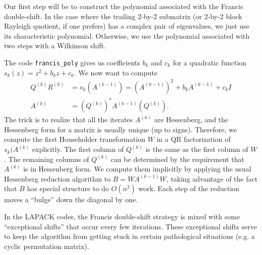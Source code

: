 Our first step will be to construct the polynomial associated with the
Francis double-shift.  In the case where the trailing 2-by-2 submatrix
(or 2-by-2 block Rayleigh quotient, if one prefers) has a complex pair
of eigenvalues, we just use its characteristic polynomial.  Otherwise,
we use the polynomial associated with two steps with a Wilkinson shift.



The code {\tt francis\_poly} gives us coefficients $b_k$ and $c_k$ for a
quadratic function $s_k(z) = z^2 + b_k z + c_k$.  We now want to compute
\begin{align*}
  Q^{(k)} R^{(k)} &= s_k(A^{(k-1)}) = (A^{(k-1)})^2 + b_k A^{(k-1)} + c_k I \\
  A^{(k)}        &= (Q^{(k)})^* A^{(k-1)} (Q^{(k)}).
\end{align*}
The trick is to realize that all the iterates $A^{(k)}$ are Hessenberg,
and the Hessenberg form for a matrix is usually unique (up to signs).
Therefore, we compute the first Householder transformation $W$ in a
QR factorization of $s_k(A^{(k)}$ explicitly.  The first column of $Q^{(k)}$
is the same as the first column of $W$.  The remaining columns of $Q^{(k)}$
can be determined by the requirement that $A^{(k)}$ is in Hessenberg form.
We compute them implicitly by applying the usual Hessenberg reduction algorithm
to $B = WA^{(k-1)}W$, taking advantage of the fact that $B$ has special
structure to do $O(n^2)$ work.  Each step of the reduction moves a ``bulge''
down the diagonal by one.



In the LAPACK codes, the Francis double-shift strategy is mixed with
some ``exceptional shifts'' that occur every few iterations.
These exceptional shifts serve to keep the algorithm from getting
stuck in certain pathological situations (e.g. a cyclic permutation
matrix).
